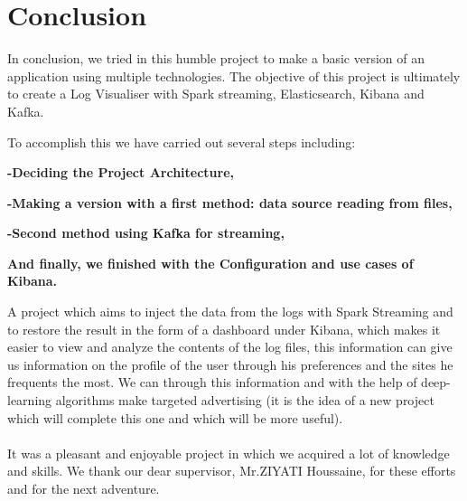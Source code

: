 \chapter*{Conclusion}
\vspace{1cm}
\par \Large 
In conclusion, we tried in this humble project to make a basic version of an application using multiple technologies. The objective of this project is ultimately to create a Log Visualiser with Spark streaming, Elasticsearch, Kibana and Kafka.  \\
\par \Large To accomplish this we have carried out several steps including: 
\begin{flushleft} \large
{
\item \textbf{-Deciding the Project Architecture,} \\[0.7cm]
\item \textbf{-Making a version with a first method: data source reading from files,}\\[0.7cm]
\item \textbf{-Second method using Kafka for streaming,}\\[0.7cm]
\item \textbf{And finally, we finished with the Configuration and use cases of Kibana.}
\item
}
\end{flushleft}

A project which aims to inject the data from the logs with Spark Streaming and to restore the result in the form of a dashboard under Kibana, which makes it easier to view and analyze the contents of the log files, this information can give us information on the profile of the user through his preferences and the sites he frequents the most. We can through this information and with the help of deep-learning algorithms make targeted advertising (it is the idea of a new project which will complete this one and which will be more useful).
\\\\
It was a pleasant and enjoyable project in which we acquired a lot of knowledge and skills.
We thank our dear supervisor, Mr.ZIYATI Houssaine, for these efforts and for the next adventure.

\newpage